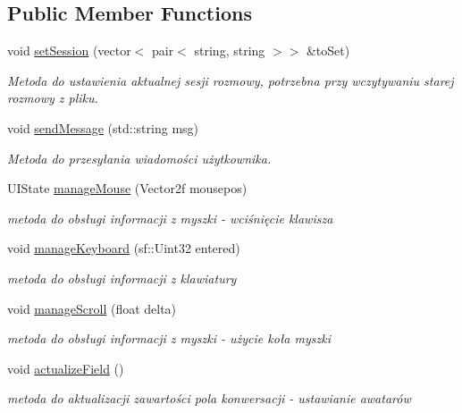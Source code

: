 \subsection*{Public Member Functions}
\begin{DoxyCompactItemize}
\item 
void \mbox{\hyperlink{class_chat_screen_a331fe5da06bc56d1256d4135cd0be324}{set\+Session}} (vector$<$ pair$<$ string, string $>$$>$ \&to\+Set)
\begin{DoxyCompactList}\small\item\em Metoda do ustawienia aktualnej sesji rozmowy, potrzebna przy wczytywaniu starej rozmowy z pliku. \end{DoxyCompactList}\item 
void \mbox{\hyperlink{class_chat_screen_abb49aa4421d806044c1778be260fb076}{send\+Message}} (std\+::string msg)
\begin{DoxyCompactList}\small\item\em Metoda do przesyłania wiadomości użytkownika. \end{DoxyCompactList}\item 
U\+I\+State \mbox{\hyperlink{class_chat_screen_a0367fc37c8e860bc044915b9d8b78682}{manage\+Mouse}} (Vector2f mousepos)
\begin{DoxyCompactList}\small\item\em metoda do obsługi informacji z myszki -\/ wciśnięcie klawisza \end{DoxyCompactList}\item 
void \mbox{\hyperlink{class_chat_screen_a1ab966165fc054af7c623e75e66c29c5}{manage\+Keyboard}} (sf\+::\+Uint32 entered)
\begin{DoxyCompactList}\small\item\em metoda do obsługi informacji z klawiatury \end{DoxyCompactList}\item 
void \mbox{\hyperlink{class_chat_screen_abd1fd89f6ecc5ddbc233a04e571de9be}{manage\+Scroll}} (float delta)
\begin{DoxyCompactList}\small\item\em metoda do obsługi informacji z myszki -\/ użycie koła myszki \end{DoxyCompactList}\item 
\mbox{\label{class_chat_screen_ae5ecb5a2afaece6b0f3b0fef21e85727}} 
void \mbox{\hyperlink{class_chat_screen_ae5ecb5a2afaece6b0f3b0fef21e85727}{actualize\+Field}} ()
\begin{DoxyCompactList}\small\item\em metoda do aktualizacji zawartości pola konwersacji -\/ ustawianie awatarów \end{DoxyCompactList}\item 
$$
\end{DoxyCompactItemize}
